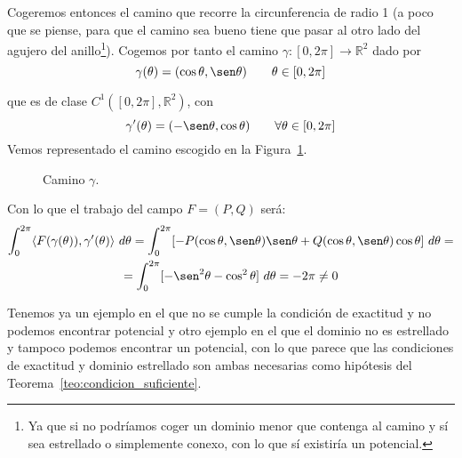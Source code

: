 \begin{ejemplo}
    Cogeremos entonces el camino que recorre la circunferencia de radio 1 (a poco que se piense, para que el camino sea bueno tiene que pasar al otro lado del agujero del anillo\footnote{Ya que si no podríamos coger un dominio menor que contenga al camino y sí sea estrellado o simplemente conexo, con lo que sí existiría un potencial.}). Cogemos por tanto el camino $\gamma:[0,2\pi]\rightarrow\mathbb{R}^2$ dado por
    \begin{equation*}
        \gamma(\theta) = (\cos\theta, \sen\theta) \qquad \theta \in [0,2\pi]
    \end{equation*}

    que es de clase $C^1([0,2\pi], \mathbb{R}^2)$, con
    \begin{equation*}
        \gamma'(\theta) = (-\sen\theta,\cos\theta) \qquad \forall \theta \in [0,2\pi]
    \end{equation*}
    Vemos representado el camino escogido en la Figura~\ref{fig:camino_ejm}.

    \begin{figure}[H]
        \centering
        \caption{Camino $\gamma$.}
        \label{fig:camino_ejm}
    \end{figure}

    Con lo que el trabajo del campo $F=(P,Q)$ será:
    \begin{multline*}
        \int_{0}^{2\pi } \langle F(\gamma(\theta)),\gamma'(\theta) \rangle~d\theta = \int_{0}^{2\pi} [-P(\cos\theta,\sen\theta)\sen\theta + Q(\cos\theta,\sen\theta)\cos\theta]~d\theta  = \\
        = \int_{0}^{2\pi } [-\sen^2\theta-\cos^2\theta]~d\theta  = -2\pi \neq 0
    \end{multline*}
\end{ejemplo}
Tenemos ya un ejemplo en el que no se cumple la condición de exactitud y no podemos encontrar potencial y otro ejemplo en el que el dominio no es estrellado y tampoco podemos encontrar un potencial, con lo que parece que las condiciones de exactitud y dominio estrellado son ambas necesarias como hipótesis del Teorema~\ref{teo:condicion_suficiente}.\\

